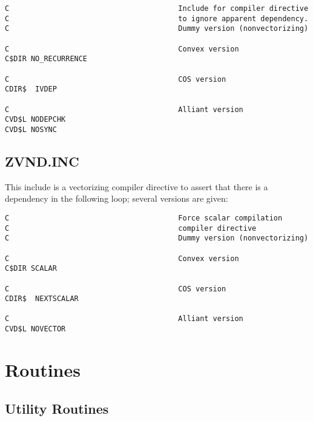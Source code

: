 \begin{verbatim}
C                                       Include for compiler directive
C                                       to ignore apparent dependency.
C                                       Dummy version (nonvectorizing)

C                                       Convex version
C$DIR NO_RECURRENCE

C                                       COS version
CDIR$  IVDEP

C                                       Alliant version
CVD$L NODEPCHK
CVD$L NOSYNC
\end{verbatim}

\subsection{ZVND.INC}
This include is a vectorizing compiler directive to assert that there
is a dependency in the following loop; several versions are given:

\begin{verbatim}
C                                       Force scalar compilation
C                                       compiler directive
C                                       Dummy version (nonvectorizing)

C                                       Convex version
C$DIR SCALAR

C                                       COS version
CDIR$  NEXTSCALAR

C                                       Alliant version
CVD$L NOVECTOR

\end{verbatim}

\section{Routines }
\subsection{Utility Routines }


